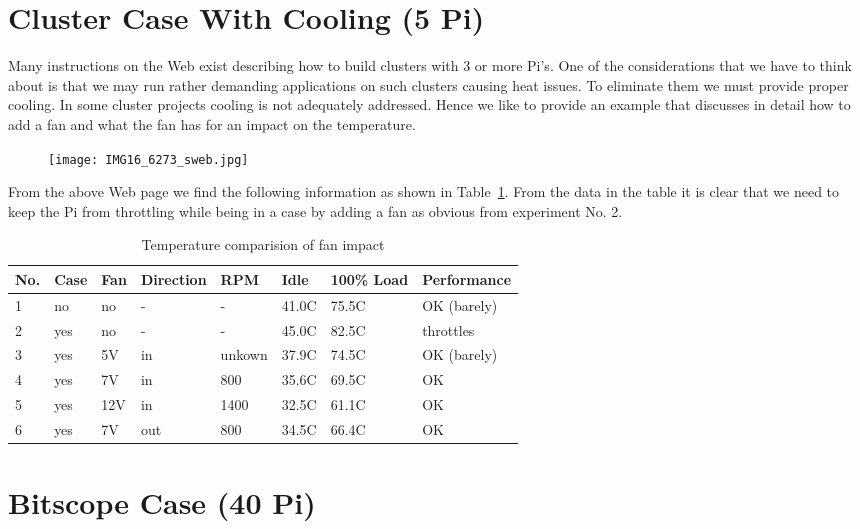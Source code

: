 \section{Cluster Case With Cooling (5 Pi)}\label{S:cluster-case-with-cooling-5-pi}

Many instructions on the Web exist describing how to build clusters with
3 or more Pi's. One of the considerations that we have to think about is
that we may run rather demanding applications on such clusters causing
heat issues. To eliminate them we must provide proper cooling. In some
cluster projects cooling is not adequately addressed. Hence we like to
provide an example that discusses in detail how to add a fan and what the
fan has for an impact on the temperature.

\begin{figure}
\centering
\texttt{[image: IMG16\_6273\_sweb.jpg]}
\caption{}
\end{figure}





From the above Web page we find the following information as shown in
Table~\ref{F:pi-fan}. From the data in the table it is clear that we
need to keep the Pi from throttling while being in a case by adding a
fan as obvious from experiment No. 2.



\begin{table}[htb]
\caption{Temperature comparision of fan impact}\label{F:pi-fan}
\bigskip
\begin{center}
\begin{tabular}{llllllll}
\hline
No. & Case & Fan & Direction & RPM & Idle & 100\% Load &
Performance\tabularnewline
\hline
1 & no & no & - & - & 41.0C & 75.5C & OK (barely)\tabularnewline
2 & yes & no & - & - & 45.0C & 82.5C & throttles\tabularnewline
3 & yes & 5V & in & unkown & 37.9C & 74.5C & OK (barely)\tabularnewline
4 & yes & 7V & in & 800 & 35.6C & 69.5C & OK\tabularnewline
5 & yes & 12V & in & 1400 & 32.5C & 61.1C & OK\tabularnewline
6 & yes & 7V & out & 800 & 34.5C & 66.4C & OK\tabularnewline
\hline
\end{tabular}
\end{center}
\end{table}




\section{Bitscope Case (40 Pi)}\label{bitscope-case-40-pi}


